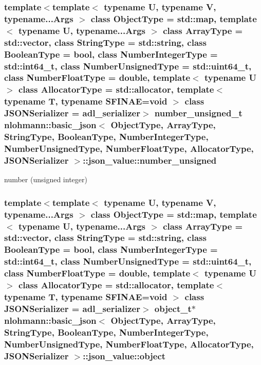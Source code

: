 \subsubsection[{\texorpdfstring{number\+\_\+unsigned}{number_unsigned}}]{\setlength{\rightskip}{0pt plus 5cm}template$<$template$<$ typename U, typename V, typename...\+Args $>$ class Object\+Type = std\+::map, template$<$ typename U, typename...\+Args $>$ class Array\+Type = std\+::vector, class String\+Type  = std\+::string, class Boolean\+Type  = bool, class Number\+Integer\+Type  = std\+::int64\+\_\+t, class Number\+Unsigned\+Type  = std\+::uint64\+\_\+t, class Number\+Float\+Type  = double, template$<$ typename U $>$ class Allocator\+Type = std\+::allocator, template$<$ typename T, typename S\+F\+I\+N\+A\+E=void $>$ class J\+S\+O\+N\+Serializer = adl\+\_\+serializer$>$ {\bf number\+\_\+unsigned\+\_\+t} {\bf nlohmann\+::basic\+\_\+json}$<$ Object\+Type, Array\+Type, String\+Type, Boolean\+Type, Number\+Integer\+Type, Number\+Unsigned\+Type, Number\+Float\+Type, Allocator\+Type, J\+S\+O\+N\+Serializer $>$\+::json\+\_\+value\+::number\+\_\+unsigned}\hypertarget{unionnlohmann_1_1basic__json_1_1json__value_a0299a6aa3bc4d45d54130e52970f73d3}{}\label{unionnlohmann_1_1basic__json_1_1json__value_a0299a6aa3bc4d45d54130e52970f73d3}


number (unsigned integer) 

\subsubsection[{\texorpdfstring{object}{object}}]{\setlength{\rightskip}{0pt plus 5cm}template$<$template$<$ typename U, typename V, typename...\+Args $>$ class Object\+Type = std\+::map, template$<$ typename U, typename...\+Args $>$ class Array\+Type = std\+::vector, class String\+Type  = std\+::string, class Boolean\+Type  = bool, class Number\+Integer\+Type  = std\+::int64\+\_\+t, class Number\+Unsigned\+Type  = std\+::uint64\+\_\+t, class Number\+Float\+Type  = double, template$<$ typename U $>$ class Allocator\+Type = std\+::allocator, template$<$ typename T, typename S\+F\+I\+N\+A\+E=void $>$ class J\+S\+O\+N\+Serializer = adl\+\_\+serializer$>$ {\bf object\+\_\+t}$\ast$ {\bf nlohmann\+::basic\+\_\+json}$<$ Object\+Type, Array\+Type, String\+Type, Boolean\+Type, Number\+Integer\+Type, Number\+Unsigned\+Type, Number\+Float\+Type, Allocator\+Type, J\+S\+O\+N\+Serializer $>$\+::json\+\_\+value\+::object}\hypertarget{unionnlohmann_1_1basic__json_1_1json__value_a4a2209bb26e7088cd36bf24824ab5521}{}\label{unionnlohmann_1_1basic__json_1_1json__value_a4a2209bb26e7088cd36bf24824ab5521}



